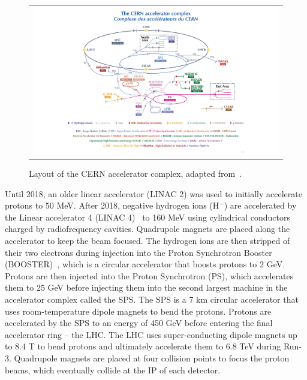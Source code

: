 \begin{figure}[tbh!]
 \begin{center}
 \begin{tabular}{c}
 \includegraphics[width=\textwidth]{figures/Part2/LHC/CERN}
 \end{tabular}
 \caption{Layout of the \ac{CERN} accelerator complex, adapted from~\cite{CERN:2022}.}
 \label{fig:LHC}
 \end{center}
\end{figure}

Until 2018, an older linear accelerator (LINAC 2) was used to initially accelerate protons to 50 MeV. After 2018, negative hydrogen ions (H$^{-}$) are accelerated by the Linear accelerator 4 (LINAC 4)~\cite{Vretenar:2020quc} to 160 MeV using cylindrical conductors charged by radiofrequency cavities. Quadrupole magnets are placed along the accelerator to keep the beam focused.  The hydrogen ions are then stripped of their two electrons during injection into the Proton Synchrotron Booster (BOOSTER)~\cite{Reich:1969fw}, which is a circular accelerator that boosts protons to 2 GeV. Protons are then injected into the Proton Synchrotron (PS), which accelerates them to 25 GeV before injecting them into the second largest machine in the accelerator complex called the \ac{SPS}. The \ac{SPS} is a 7 km circular accelerator that uses room-temperature dipole magnets to bend the protons. Protons are accelerated by the \ac{SPS} to an energy of 450 GeV before entering the final accelerator ring -- the \ac{LHC}. The \ac{LHC} uses super-conducting dipole magnets up to 8.4 T to bend protons and ultimately accelerate them to 6.8 TeV during Run-3. Quadrupole magnets are placed at four collision points to focus the proton beams, which eventually collide at the \ac{IP} of each detector. 


